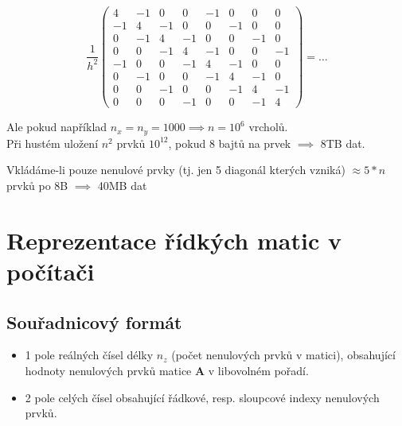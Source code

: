 \documentclass[../main.tex]{subfiles}
\begin{document}
\begin{example}
    \begin{equation*}
        \frac{1}{h^2} \begin{pmatrix}
            4 & -1 & 0 & 0 & -1 & 0 & 0 & 0 \\
            -1 & 4 & -1 & 0 & 0 & -1 & 0 & 0 \\
            0 & -1 & 4 & -1 & 0 & 0 & -1 & 0 \\
            0 & 0 & -1 & 4 & -1 & 0 & 0 & -1 \\
            -1 & 0 & 0 & -1 & 4 & -1 & 0 & 0 \\
            0 & -1 & 0 & 0 & -1 & 4 & -1 & 0 \\
            0 & 0 & -1 & 0 & 0 & -1 & 4 & -1 \\
            0 & 0 & 0 & -1 & 0 & 0 & -1 & 4 
            \end{pmatrix} = \dots
    \end{equation*}

    Ale pokud například $n_x = n_y = 1000 \implies n=10^6$ vrcholů.\\
    Při hustém uložení $n^2$ prvků $10^{12}$, pokud 8 bajtů na prvek $\implies$ 8TB dat.

    Vkládáme-li pouze nenulové prvky (tj. jen 5 diagonál kterých vzniká) $\approx 5*n$ prvků po 8B $\implies$ 40MB dat
\end{example}


\section{Reprezentace řídkých matic v počítači}
\subsection{Souřadnicový formát}
\begin{itemize}
    \item 1 pole reálných čísel délky $n_z$ (počet nenulových prvků v matici), 
    obsahující hodnoty nenulových prvků matice $\mathbf{A}$ v libovolném pořadí.
    \item 2 pole celých čísel obsahující řádkové, resp. sloupcové indexy nenulových prvků.
\end{itemize}
\end{document}
